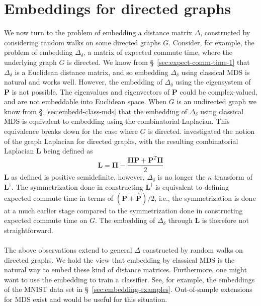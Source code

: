 \section{Embeddings for directed graphs}
\label{sec:embedd-dist-direct}
We now turn to the problem of embedding a distance matrix $\Delta$,
constructed by considering random walks on some directed graphs
$G$. Consider, for example, the problem of embedding $\Delta_{\delta}$,
a matrix of expected commute time, where the underlying graph $G$ is
directed. We know from \S~\ref{sec:expect-comm-time-1} that
$\Delta_{\delta}$ is a Euclidean distance matrix, and so embedding
$\Delta_\delta$ using classical MDS is natural and works
well. However, the embedding of $\Delta_\delta$ using the eigensystem
of $\mathbf{P}$ is not possible. The eigenvalues and
eigenvectors of $\mathbf{P}$ could be complex-valued, and are not
embeddable into Euclidean space. When $G$ is an undirected graph we
know from \S~\ref{sec:embedd-class-mds} that the
embedding of $\Delta_{\delta}$ using classical MDS is equivalent to
embedding using the combinatorial Laplacian. This equivalence breaks
down for the case where $G$ is directed. \citet{chung05:_laplac_cheeg}
investigated the notion of the graph Laplacian for directed graphs, with the
resulting combinatorial Laplacian $\mathbf{L}$ being defined as
\begin{equation}
  \label{eq:125}
  \mathbf{L} = \bm{\Pi} - \frac{\bm{\Pi}\mathbf{P} + \mathbf{P}^{T}\bm{\Pi}}{2}
\end{equation}
$\mathbf{L}$ as defined is positive semidefinite, however,
$\Delta_{\delta}$ is no longer the $\kappa$ transform of
$\mathbf{L}^{\dagger}$. The symmetrization done in
constructing $\mathbf{L}^{\dagger}$ is equivalent to defining 
expected commute time in terms of $(\mathbf{P} + \hat{\mathbf{P}})/2$,
i.e., the symmetrization is done at a much earlier stage compared to
the symmetrization done in constructing expected commute time on $G$.
The embedding of $\Delta_{\delta}$ through
$\mathbf{L}$ is therefore not straightforward. \\ \\
%
\noindent
The above observations extend to general $\Delta$ constructed by
random walks on directed graphs. We hold the view that embedding by
classical MDS is the natural way to embed these kind of distance
matrices. Furthermore, one might want to use the embedding to train a
classifier. See, for example, the embeddings of the MNIST data set in
\S~\ref{sec:embedding-examples}. Out-of-sample extensions for MDS
exist and would be useful for this situation. 
%
